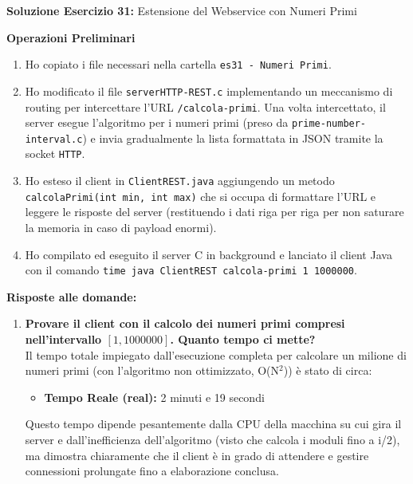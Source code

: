 \documentclass[11pt]{article}
\begin{document}
\begin{tcolorbox}[colback=green!5!white,colframe=green!75!black,title=\textbf{RISPOSTA}, breakable]
\textbf{Soluzione Esercizio 31:} Estensione del Webservice con Numeri Primi

\textbf{Operazioni Preliminari}
\begin{enumerate}
    \item Ho copiato i file necessari nella cartella \texttt{es31 - Numeri Primi}.
    \item Ho modificato il file \texttt{serverHTTP-REST.c} implementando un meccanismo di routing per intercettare l'URL \texttt{/calcola-primi}. Una volta intercettato, il server esegue l'algoritmo per i numeri primi (preso da \texttt{prime-number-interval.c}) e invia gradualmente la lista formattata in JSON tramite la socket \texttt{HTTP}.
    \item Ho esteso il client in \texttt{ClientREST.java} aggiungendo un metodo \texttt{calcolaPrimi(int min, int max)} che si occupa di formattare l'URL e leggere le risposte del server (restituendo i dati riga per riga per non saturare la memoria in caso di payload enormi).
    \item Ho compilato ed eseguito il server C in background e lanciato il client Java con il comando \texttt{time java ClientREST calcola-primi 1 1000000}.
\end{enumerate}

\textbf{Risposte alle domande:}

\begin{enumerate}
    \item \textbf{Provare il client con il calcolo dei numeri primi compresi nell'intervallo $[1, 1000000]$. Quanto tempo ci mette?}\\
    Il tempo totale impiegato dall'esecuzione completa per calcolare un milione di numeri primi (con l'algoritmo non ottimizzato, O(N$^2$)) è stato di circa:
    \begin{itemize}
        \item \textbf{Tempo Reale (real):} 2 minuti e 19 secondi
    \end{itemize}
    Questo tempo dipende pesantemente dalla CPU della macchina su cui gira il server e dall'inefficienza dell'algoritmo (visto che calcola i moduli fino a i/2), ma dimostra chiaramente che il client è in grado di attendere e gestire connessioni prolungate fino a elaborazione conclusa.


\end{enumerate}
\end{tcolorbox}
\end{document}
